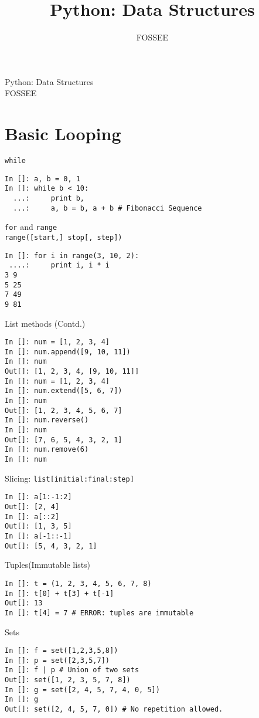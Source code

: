 \documentclass[12pt]{article}
\title{Python: Data Structures}
\author{FOSSEE}
\newcommand{\typ}[1]{\lstinline{#1}}
\begin{document}
\date{}
\vspace{-1in}
\begin{center}
\LARGE{Python: Data Structures}\\
\large{FOSSEE}
\end{center}
\section{Basic Looping}
\typ{while}
  \begin{lstlisting}
In []: a, b = 0, 1
In []: while b < 10:
  ...:     print b,
  ...:     a, b = b, a + b # Fibonacci Sequence
\end{lstlisting}
\typ{for} and \typ{range}\\
\typ{range([start,] stop[, step])}
\begin{lstlisting}
In []: for i in range(3, 10, 2):
 ....:     print i, i * i
3 9
5 25
7 49
9 81
\end{lstlisting}
List methods (Contd.)
\begin{lstlisting}
In []: num = [1, 2, 3, 4]
In []: num.append([9, 10, 11])
In []: num
Out[]: [1, 2, 3, 4, [9, 10, 11]]
In []: num = [1, 2, 3, 4]
In []: num.extend([5, 6, 7])
In []: num
Out[]: [1, 2, 3, 4, 5, 6, 7]
In []: num.reverse()
In []: num
Out[]: [7, 6, 5, 4, 3, 2, 1]
In []: num.remove(6)
In []: num
\end{lstlisting}
Slicing: \typ{list[initial:final:step]}
\begin{lstlisting}
In []: a[1:-1:2]
Out[]: [2, 4]
In []: a[::2]
Out[]: [1, 3, 5]
In []: a[-1::-1]
Out[]: [5, 4, 3, 2, 1]
\end{lstlisting}
Tuples(Immutable lists)
\begin{lstlisting}
In []: t = (1, 2, 3, 4, 5, 6, 7, 8)
In []: t[0] + t[3] + t[-1]
Out[]: 13
In []: t[4] = 7 # ERROR: tuples are immutable
\end{lstlisting}
Sets
\begin{lstlisting}
In []: f = set([1,2,3,5,8])
In []: p = set([2,3,5,7])
In []: f | p # Union of two sets
Out[]: set([1, 2, 3, 5, 7, 8])
In []: g = set([2, 4, 5, 7, 4, 0, 5])
In []: g
Out[]: set([2, 4, 5, 7, 0]) # No repetition allowed.
\end{lstlisting}
\end{document}
